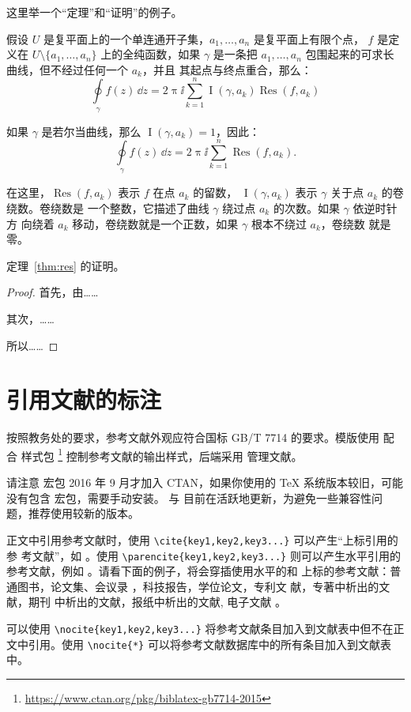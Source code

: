 这里举一个“定理”和“证明”的例子。
\begin{theorem}[留数定理]
\label{thm:res}
  假设 $U$ 是复平面上的一个单连通开子集，$a_1, \ldots, a_n$ 是复平面上有限个点，
  $f$ 是定义在 $U \setminus \{a_1, \ldots, a_n\}$ 上的全纯函数，如果 $\gamma$
  是一条把 $a_1, \ldots, a_n$ 包围起来的可求长曲线，但不经过任何一个 $a_k$，并且
  其起点与终点重合，那么：
  \begin{equation}
    \label{eq:res}
    \oint\limits_\gamma f(z)\, \dd z = 2\uppi \ii \sum_{k=1}^n \operatorname{I}(\gamma, a_k) \operatorname{Res}(f, a_k)
  \end{equation}

  如果 $\gamma$ 是若尔当曲线，那么 $\operatorname{I}(\gamma, a_k) = 1$，因此：
  \begin{equation}
    \label{eq:resthm}
    \oint\limits_\gamma f(z)\, \dd z = 2\uppi \ii \sum_{k=1}^n \operatorname{Res}(f, a_k).
  \end{equation}

  在这里，$\operatorname{Res}(f, a_k)$ 表示 $f$ 在点 $a_k$ 的留数，
  $\operatorname{I}(\gamma, a_k)$ 表示 $\gamma$ 关于点 $a_k$ 的卷绕数。卷绕数是
  一个整数，它描述了曲线 $\gamma$ 绕过点 $a_k$ 的次数。如果 $\gamma$ 依逆时针方
  向绕着 $a_k$ 移动，卷绕数就是一个正数，如果 $\gamma$ 根本不绕过 $a_k$，卷绕数
  就是零。

  定理~\ref{thm:res} 的证明。

  \begin{proof}
    首先，由……

    其次，……

    所以……
  \end{proof}
\end{theorem}

\section{引用文献的标注}

按照教务处的要求，参考文献外观应符合国标 GB/T 7714 的要求。模版使用 \BibLaTeX{}
配合  样式包%
\footnote{\url{https://www.ctan.org/pkg/biblatex-gb7714-2015}}%
控制参考文献的输出样式，后端采用  管理文献。

请注意  宏包 2016 年 9 月才加入 CTAN，如果你使用的
\TeX{} 系统版本较旧，可能没有包含  宏包，需要手动安装。
\BibLaTeX{} 与  目前在活跃地更新，为避免一些兼容性问
题，推荐使用较新的版本。

正文中引用参考文献时，使用 \verb|\cite{key1,key2,key3...}| 可以产生“上标引用的参
考文献”，如 \cite{Yu2001,Cheng1999,LSC1957}。使用
\verb|\parencite{key1,key2,key3...}| 则可以产生水平引用的参考文献，例如
\parencite{Li1999,Jiang1989,Hopkinson1999}。请看下面的例子，将会穿插使用水平的和
上标的参考文献：普通图书\parencite{Yu2001,Jiang1998}，论文集、会议录
\cite{CSTAM1990}，科技报告\parencite{WHO1970}，学位论文\cite{Zhang1998}，专利文
献\parencite{Jiang1989,HBLZ2001}，专著中析出的文献\cite{Cheng1999,GBT2659}，期刊
中析出的文献\parencite{Li1999,Li2000}，报纸中析出的文献\cite{Ding2000}, 电子文献
\parencite{Jiang1999,Christine1998,Xiao2001}。

可以使用 \verb|\nocite{key1,key2,key3...}| 将参考文献条目加入到文献表中但不在正
文中引用。使用 \verb|\nocite{*}| 可以将参考文献数据库中的所有条目加入到文献表
中。
\nocite{Yang1999,Schinstock2000,Wen1990,GBT16159}
